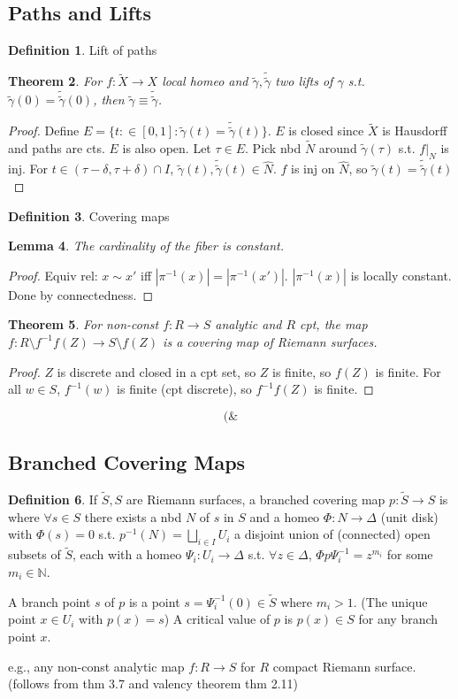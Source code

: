 \documentclass{article}
\theoremstyle{definition}
\newtheorem{defn}{Definition}[section]
\theoremstyle{remark}
\theoremstyle{plain}
\newtheorem{lem}[defn]{Lemma}
\newtheorem{thm}[defn]{Theorem}
\newcommand{\NN}{\mathbb{N}}
\begin{document}
\subsection{Paths and  Lifts}
\begin{defn}
    Lift of paths 
\end{defn}
\begin{thm}
    For $f:\tilde X\to X$ local homeo and $\tilde\gamma,\tilde{\tilde\gamma}$ two lifts of $\gamma$ s.t. $\tilde\gamma(0)=\tilde{\tilde\gamma}(0)$, then $\tilde\gamma\equiv\tilde{\tilde\gamma}$.
\end{thm}
\begin{proof}
    Define $E=\{t:\in[0,1]:\tilde\gamma(t)=\tilde{\tilde\gamma}(t)\}$. $E$ is closed since $\tilde X$ is Hausdorff and paths are cts. $E$ is also open. Let $\tau\in E$. Pick nbd $\tilde N$ around $\tilde\gamma(\tau)$ s.t. $f|_{\hat N}$ is inj. For $t\in(\tau-\delta,\tau+\delta)\cap I$, $\tilde\gamma(t),\tilde{\tilde\gamma}(t)\in\hat N$. $f$ is inj on $\hat N$, so $\tilde\gamma(t)=\tilde{\tilde\gamma}(t)$
\end{proof}
\begin{defn}
    Covering maps
\end{defn}
\begin{lem}
    The cardinality of the fiber is constant.
\end{lem}
\begin{proof}
    Equiv rel: $x\sim x'$ iff $|\pi^{-1}(x)|=|\pi^{-1}(x')|$. $|\pi^{-1}(x)|$ is locally constant. Done by connectedness.
\end{proof}
\begin{thm}
    For non-const $f:R\to S$ analytic and $R$ cpt, the map $f:R\setminus f^{-1}f(Z)\to S\setminus f(Z)$ is a covering map of Riemann surfaces.
\end{thm}
\begin{proof}
    $Z$ is discrete and closed in a cpt set, so $Z$ is finite, so $f(Z)$ is finite. For all $w\in S$, $f^{-1}(w)$ is finite (cpt discrete), so $f^{-1}f(Z)$ is finite.
\end{proof}
\[(\&\tag{Owen's Soognature}\]
\subsection{Branched Covering Maps}
\begin{defn}
    If $\tilde S, S$ are Riemann surfaces, a branched covering map $p:\tilde S\to S$ is where $\forall s\in S$ there exists a nbd  $N$ of $s$ in $S$ and a homeo $\Phi:N\to\Delta$ (unit disk) with $\Phi(s)=0$ s.t. $p^{-1}(N)=\bigsqcup_{i\in I} U_i$ a disjoint union of (connected) open subsets of $\tilde S$, each with a homeo $\Psi_i:U_i\to \Delta$ s.t. $\forall z\in \Delta$, $\Phi p\Psi_i^{-1}=z^{m_i}$ for some $m_i\in\NN$.

    A branch point $s$ of $p$ is a point $s=\Psi_i^{-1}(0)\in\tilde S$ where $m_i>1$. (The unique point $x\in U_i$ with $p(x)=s$) A critical value of $p$ is $p(x)\in S$ for any branch point $x$.
\end{defn}
e.g., any non-const analytic map $f:R\to S$ for $R$ compact Riemann surface. (follows from thm 3.7 and valency theorem thm 2.11)
\end{document}
